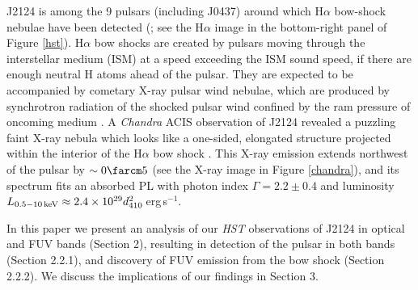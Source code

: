 \documentclass[iop]{emulateapj}
\begin{document}
J2124 is among the 9 pulsars (including J0437) around which H$\alpha$ bow-shock nebulae have been detected (\citealt{2014ApJ...784..154B,2002ApJ...580L.137G}; see the H$\alpha$ image in the bottom-right panel of Figure \ref{hst}). H$\alpha$ bow shocks are created by pulsars moving through the interstellar medium (ISM) at a speed exceeding the ISM sound speed, if there are enough neutral H atoms ahead of the pulsar. They are expected to be accompanied by cometary X-ray pulsar wind nebulae, which are produced by synchrotron radiation of the shocked pulsar wind confined by the ram pressure of oncoming medium \citep{2008AIPC..983..171K}. A {\sl Chandra} ACIS observation of J2124 revealed a puzzling faint X-ray nebula which looks like a one-sided, elongated structure projected  within the interior of the  H$\alpha$ bow shock \citep{2005AAS...20718313C,2006A&A...448L..13H}. This X-ray emission extends northwest of the pulsar by $\sim0\farcm5$ (see the X-ray image in Figure \ref{chandra}), and its spectrum fits an absorbed PL with photon index $\Gamma=2.2\pm0.4$ and luminosity $L_{0.5-10\,{\rm keV}}\approx 2.4\times10^{29} d_{410}^2$\,erg\,s$^{-1}$.

In this paper we present an analysis of our {\sl HST} observations of J2124 in optical and FUV bands (Section 2), resulting in detection of the pulsar in both bands (Section 2.2.1), and discovery of  FUV emission from the bow shock (Section 2.2.2).  We discuss the implications of our findings in Section 3.
\end{document}
